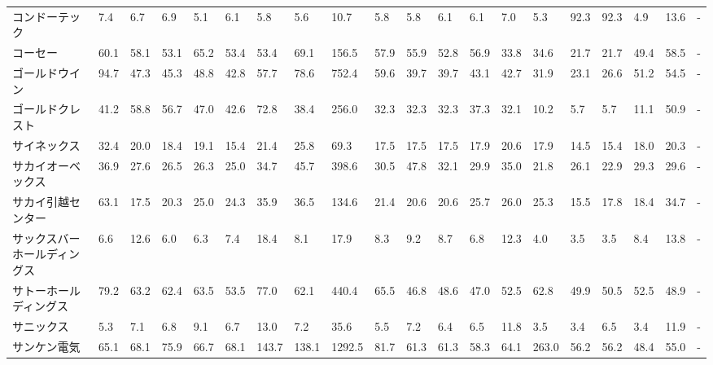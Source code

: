 \begin{longtable}[c]{lp{3mm}p{3mm}p{3mm}p{3mm}p{3mm}p{3mm}p{3mm}p{3mm}p{3mm}p{3mm}p{3mm}p{3mm}p{3mm}p{3mm}p{3mm}p{3mm}p{3mm}p{3mm}p{3mm}}
コンドーテック         &    7.4 &    6.7 &       6.9 &       5.1 &        6.1 &     5.8 &     5.6 &     10.7 &     5.8 &     5.8 &    6.1 &    6.1 &     7.0 &     5.3 &    92.3 &   92.3 &    4.9 &    13.6 &      - \\
コーセー            &   60.1 &   58.1 &      53.1 &      65.2 &       53.4 &    53.4 &    69.1 &    156.5 &    57.9 &    55.9 &   52.8 &   56.9 &    33.8 &    34.6 &    21.7 &   21.7 &   49.4 &    58.5 &      - \\
ゴールドウイン         &   94.7 &   47.3 &      45.3 &      48.8 &       42.8 &    57.7 &    78.6 &    752.4 &    59.6 &    39.7 &   39.7 &   43.1 &    42.7 &    31.9 &    23.1 &   26.6 &   51.2 &    54.5 &      - \\
ゴールドクレスト        &   41.2 &   58.8 &      56.7 &      47.0 &       42.6 &    72.8 &    38.4 &    256.0 &    32.3 &    32.3 &   32.3 &   37.3 &    32.1 &    10.2 &     5.7 &    5.7 &   11.1 &    50.9 &      - \\
サイネックス          &   32.4 &   20.0 &      18.4 &      19.1 &       15.4 &    21.4 &    25.8 &     69.3 &    17.5 &    17.5 &   17.5 &   17.9 &    20.6 &    17.9 &    14.5 &   15.4 &   18.0 &    20.3 &      - \\
サカイオーベックス       &   36.9 &   27.6 &      26.5 &      26.3 &       25.0 &    34.7 &    45.7 &    398.6 &    30.5 &    47.8 &   32.1 &   29.9 &    35.0 &    21.8 &    26.1 &   22.9 &   29.3 &    29.6 &      - \\
サカイ引越センター       &   63.1 &   17.5 &      20.3 &      25.0 &       24.3 &    35.9 &    36.5 &    134.6 &    21.4 &    20.6 &   20.6 &   25.7 &    26.0 &    25.3 &    15.5 &   17.8 &   18.4 &    34.7 &      - \\
サックスバー　ホールディングス &    6.6 &   12.6 &       6.0 &       6.3 &        7.4 &    18.4 &     8.1 &     17.9 &     8.3 &     9.2 &    8.7 &    6.8 &    12.3 &     4.0 &     3.5 &    3.5 &    8.4 &    13.8 &      - \\
サトーホールディングス     &   79.2 &   63.2 &      62.4 &      63.5 &       53.5 &    77.0 &    62.1 &    440.4 &    65.5 &    46.8 &   48.6 &   47.0 &    52.5 &    62.8 &    49.9 &   50.5 &   52.5 &    48.9 &      - \\
サニックス           &    5.3 &    7.1 &       6.8 &       9.1 &        6.7 &    13.0 &     7.2 &     35.6 &     5.5 &     7.2 &    6.4 &    6.5 &    11.8 &     3.5 &     3.4 &    6.5 &    3.4 &    11.9 &      - \\
サンケン電気          &   65.1 &   68.1 &      75.9 &      66.7 &       68.1 &   143.7 &   138.1 &   1292.5 &    81.7 &    61.3 &   61.3 &   58.3 &    64.1 &   263.0 &    56.2 &   56.2 &   48.4 &    55.0 &      - \\

\end{longtable}
